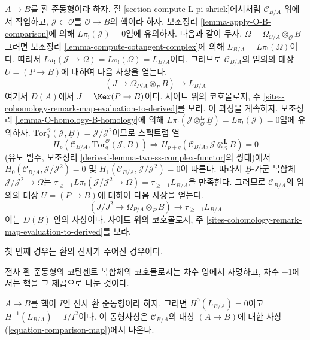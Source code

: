 \begin{remark}
\label{remark-make-map}
$A \to B$를 환 준동형이라 하자. 절
\ref{section-compute-L-pi-shriek}에서처럼 $\mathcal{C}_{B/A}$ 위에서
작업하고, $\mathcal{J} \subset \mathcal{O}$를
$\mathcal{O} \to \underline{B}$의 핵이라 하자. 보조정리
\ref{lemma-apply-O-B-comparison}에 의해 $L\pi_!(\mathcal{J}) = 0$임에
유의하자. 다음과 같이 두자.
$\Omega =  \Omega_{\mathcal{O}/A} \otimes_\mathcal{O} \underline{B}$
그러면 보조정리 \ref{lemma-compute-cotangent-complex}에 의해
$L_{B/A} = L\pi_!(\Omega)$이다. 따라서
$L\pi_!(\mathcal{J} \to \Omega) = L\pi_!(\Omega) = L_{B/A}$이다.
그러므로 $\mathcal{C}_{B/A}$의 임의의 대상 $U = (P \to B)$에 대하여
다음 사상을 얻는다.
\begin{equation}
\label{equation-comparison-map-A}
(J \to \Omega_{P/A} \otimes_P B) \longrightarrow L_{B/A}
\end{equation}
여기서 $D(A)$에서 $J = \Ker(P \to B)$이다. 사이트 위의 코호몰로지, 주
\ref{sites-cohomology-remark-map-evaluation-to-derived}를 보라.
이 과정을 계속하자. 보조정리
\ref{lemma-O-homology-B-homology}에 의해
$L\pi_!(\mathcal{J} \otimes_\mathcal{O}^\mathbf{L} \underline{B}) =
L\pi_!(\mathcal{J}) = 0$임에 유의하자.
$\text{Tor}_0^\mathcal{O}(\mathcal{J}, \underline{B}) =
\mathcal{J}/\mathcal{J}^2$이므로 스펙트럼 열
$$
H_p(\mathcal{C}_{B/A}, \text{Tor}_q^\mathcal{O}(\mathcal{J}, \underline{B}))
\Rightarrow 
H_{p + q}(\mathcal{C}_{B/A},
\mathcal{J} \otimes_\mathcal{O}^\mathbf{L} \underline{B}) = 0
$$
(유도 범주, 보조정리 \ref{derived-lemma-two-ss-complex-functor}의 쌍대)에서
$H_0(\mathcal{C}_{B/A}, \mathcal{J}/\mathcal{J}^2) = 0$
및 $H_1(\mathcal{C}_{B/A}, \mathcal{J}/\mathcal{J}^2) = 0$이 따른다.
따라서 $\underline{B}$-가군 복합체
$\mathcal{J}/\mathcal{J}^2 \to \Omega$는
$\tau_{\geq -1}L\pi_!(\mathcal{J}/\mathcal{J}^2 \to \Omega) =
\tau_{\geq -1}L_{B/A}$을 만족한다. 그러므로 $\mathcal{C}_{B/A}$의 임의의
대상 $U = (P \to B)$에 대하여 다음 사상을 얻는다.
\begin{equation}
\label{equation-comparison-map}
(J/J^2 \to \Omega_{P/A} \otimes_P B) \longrightarrow \tau_{\geq -1}L_{B/A}
\end{equation}
이는 $D(B)$ 안의 사상이다. 사이트 위의 코호몰로지, 주
\ref{sites-cohomology-remark-map-evaluation-to-derived}를 보라.
\end{remark}

\noindent
첫 번째 경우는 환의 전사가 주어진 경우이다.

\begin{lemma}
\label{lemma-surjection}
\begin{slogan}
전사 환 준동형의 코탄젠트 복합체의 코호몰로지는 차수 영에서 자명하고,
차수 $-1$에서는 핵을 그 제곱으로 나눈 것이다.
\end{slogan}
$A \to B$를 핵이 $I$인 전사 환 준동형이라 하자. 그러면
$H^0(L_{B/A}) = 0$이고 $H^{-1}(L_{B/A}) = I/I^2$이다. 이 동형사상은
$\mathcal{C}_{B/A}$의 대상 $(A \to B)$에 대한 사상
(\ref{equation-comparison-map})에서 나온다.
\end{lemma}

